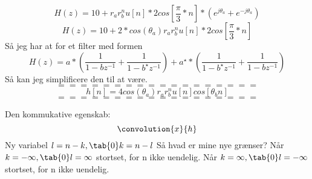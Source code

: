 \begin{Udledninger}
\begin{underrubrik}
        \[H(z) = 10 + r_a r_b^nu[n] * 2cos[\frac{\pi}{3}*n] * (e^{j\theta_a} + e^{-j\theta_a})\]
        \[H(z) = 10 + 2 * cos(\theta_a) r_a r_b^nu[n] * 2cos[\frac{\pi}{3}*n]\]
        Så jeg har at for et filter med formen 
        \[H(z) = a * (\frac{1}{1 - bz^{-1}} + \frac{1}{1 - b^\star z^{-1}}) + a^\star * ( \frac{1}{1 - b^\star z^{-1}} + \frac{1}{1 - bz^{-1}})\]
        Så kan jeg simplificere den til at være. 
        \[==================\]
        \[h[n] = 4 cos(\theta_a) r_a r_b^nu[n] cos[\theta_b n]\]
        \[==================\]
    \end{underrubrik}



    \begin{underrubrik}
        Den kommukative egenskab:
        \[\convolution{x}{h}\]
        Ny variabel $l = n - k, \tab{0} k = n - l$
        Så hvad er mine nye grænser? 
        Når $k=-\infty, \tab{0} l = \infty$ stortset, for n ikke uendelig.
        Når $k=\infty, \tab{0} l = -\infty$ stortset, for n ikke uendelig.
        

\end{underrubrik}
\end{Udledninger}
